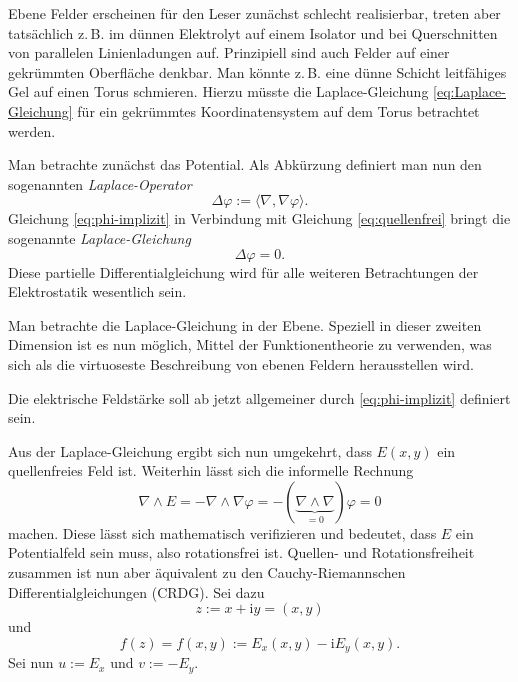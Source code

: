 \documentclass[a4paper,11pt,fleqn,twocolumn,twoside,dvipdfmx]{scrartcl}
\newcommand{\ui}{\mathrm i}
\begin{document}
Ebene Felder erscheinen für den Leser zunächst schlecht realisierbar,
treten aber tatsächlich z.\,B. im dünnen Elektrolyt auf einem
Isolator und bei Querschnitten von parallelen Linienladungen auf.
Prinzipiell sind auch Felder auf einer gekrümmten Oberfläche
denkbar. Man könnte z.\,B. eine dünne Schicht leitfähiges Gel
auf einen Torus schmieren. Hierzu müsste die Laplace-Gleichung
\eqref{eq:Laplace-Gleichung} für ein gekrümmtes Koordinatensystem
auf dem Torus betrachtet werden.

Man betrachte zunächst das Potential.
Als Abkürzung definiert man nun den sogenannten \emph{Laplace-Operator}
\begin{equation}
\Delta\varphi := \langle\nabla,\nabla\varphi\rangle.
\end{equation}
Gleichung
\eqref{eq:phi-implizit} in Verbindung mit Gleichung
\eqref{eq:quellenfrei} bringt die sogenannte \emph{Laplace-Gleichung}
\begin{equation}\label{eq:Laplace-Gleichung}
\Delta\varphi = 0.
\end{equation}
Diese partielle Differentialgleichung wird für alle weiteren
Betrachtungen der Elektrostatik wesentlich sein.

Man betrachte die Laplace-Gleichung in der Ebene.
Speziell in dieser zweiten Dimension ist es nun möglich,
Mittel der Funktionentheorie zu verwenden,
was sich als die virtuoseste Beschreibung von ebenen Feldern
herausstellen wird.

Die elektrische Feldstärke soll ab jetzt allgemeiner durch
\eqref{eq:phi-implizit} definiert sein.

Aus der Laplace-Gleichung ergibt sich nun umgekehrt, dass $E(x,y)$
ein quellenfreies Feld ist. Weiterhin lässt sich die
informelle Rechnung
\begin{equation}
\nabla\wedge E
= -\nabla\wedge\nabla\varphi
= -(\underbrace{\nabla\wedge\nabla}_{=0})\varphi =0
\end{equation}
machen. Diese lässt sich mathematisch verifizieren und bedeutet,
dass $E$ ein Potentialfeld sein muss, also rotationsfrei ist.
Quellen- und Rotationsfreiheit zusammen ist nun aber
äquivalent zu den Cauchy-Riemannschen Differentialgleichungen
(CRDG). Sei dazu
\begin{equation}
z:=x+\ui y=(x,y)
\end{equation}
und
\begin{equation}
f(z)=f(x,y):=E_x(x,y)-\mathrm{i}E_y(x,y).
\end{equation}
Sei nun $u:=E_x$ und $v:=-E_y$.
\end{document}
